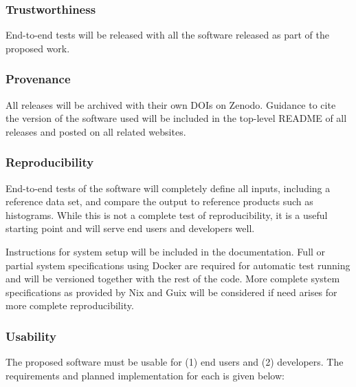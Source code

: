 

\subsubsection*{Trustworthiness}
End-to-end tests will be released with all the software released as part of the proposed work.

\subsubsection*{Provenance}
All releases will be archived with their own DOIs on Zenodo.  Guidance to cite the version of the software used will be included in the top-level README of all releases and posted on all related websites.

\subsubsection*{Reproducibility}
End-to-end tests of the software will completely define all inputs, including a reference data set, and compare the output to reference products such as histograms.  While this is not a complete test of reproducibility, it is a useful starting point and will serve end users and developers well.  

Instructions for system setup will be included in the documentation.  Full or partial system specifications using Docker are required for automatic test running and will be versioned together with the rest of the code.  More complete system specifications as provided by Nix and Guix will be considered if need arises for more complete reproducibility.

\subsubsection*{Usability}
The proposed software must be usable for (1) end users and (2) developers.  The requirements and planned implementation for each is given below:

